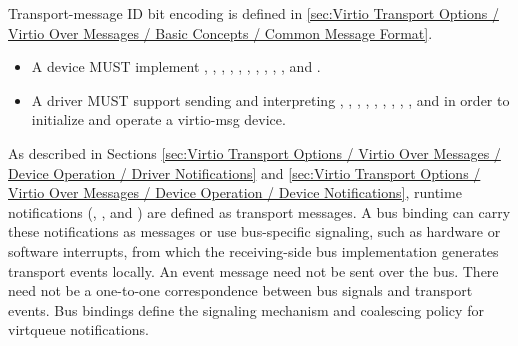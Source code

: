 Transport-message ID bit encoding is defined in
\ref{sec:Virtio Transport Options / Virtio Over Messages / Basic Concepts / Common Message Format}.

\begin{itemize}
  \item A device MUST implement ,
        , ,
        , , ,
        , , ,
        , and .
\end{itemize}

\begin{itemize}
  \item A driver MUST support sending and interpreting
        , ,
        , ,
        , ,
        , ,
        , and  in order to
        initialize and operate a virtio-msg device.
\end{itemize}

As described in Sections
\ref{sec:Virtio Transport Options / Virtio Over Messages / Device Operation / Driver Notifications}
and
\ref{sec:Virtio Transport Options / Virtio Over Messages / Device Operation / Device Notifications},
runtime notifications (, , and
) are defined as transport messages. A bus binding can
carry these notifications as messages or use bus-specific signaling, such as
hardware or software interrupts, from which the receiving-side bus
implementation generates transport events locally. An event message need not
be sent over the bus. There need not be a one-to-one correspondence between
bus signals and transport events. Bus bindings define the signaling mechanism
and coalescing policy for virtqueue notifications.

